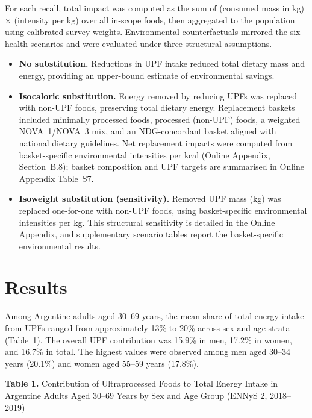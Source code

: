 ﻿\documentclass{article}
\begin{document}
For each recall, total impact was computed as the sum of (consumed mass in kg) $\times$ (intensity per kg) over all in-scope foods, then aggregated to the population using calibrated survey weights. Environmental counterfactuals mirrored the six health scenarios and were evaluated under three structural assumptions.

\begin{itemize}
    \item \textbf{No substitution.} Reductions in UPF intake reduced total dietary mass and energy, providing an upper-bound estimate of environmental savings.
    \item \textbf{Isocaloric substitution.} Energy removed by reducing UPFs was replaced with non-UPF foods, preserving total dietary energy. Replacement baskets included minimally processed foods, processed (non-UPF) foods, a weighted NOVA~1/NOVA~3 mix, and an NDG-concordant basket aligned with national dietary guidelines.\cite{NDG2016} Net replacement impacts were computed from basket-specific environmental intensities per kcal (Online Appendix, Section~B.8); basket composition and UPF targets are summarised in Online Appendix Table~S7.
    \item \textbf{Isoweight substitution (sensitivity).} Removed UPF mass (kg) was replaced one-for-one with non-UPF foods, using basket-specific environmental intensities per kg. This structural sensitivity is detailed in the Online Appendix, and supplementary scenario tables report the basket-specific environmental results.
\end{itemize}

\section{Results}\label{results}

Among Argentine adults aged 30--69 years, the mean share of total energy intake from UPFs ranged from approximately 13\% to 20\% across sex and age strata (Table~1). The overall UPF contribution was 15.9\% in men, 17.2\% in women, and 16.7\% in total. The highest values were observed among men aged 30--34 years (20.1\%) and women aged 55--59 years (17.8\%).

\vspace{0.8em}
\textbf{Table 1.} Contribution of Ultraprocessed Foods to Total Energy Intake in Argentine Adults Aged 30--69 Years by Sex and Age Group (ENNyS 2, 2018--2019)
\end{document}
